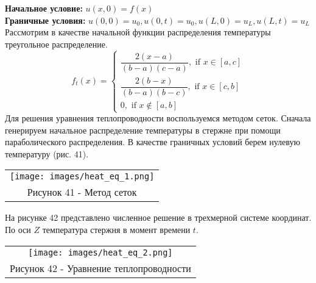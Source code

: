 \textbf{Начальное условие:} $u(x,0)=f(x)$\\
\textbf{Граничные условия:} $u(0,0)=u_0,u(0,t)=u_0,u(L,0)=u_L,u(L,t)=u_L$
Рассмотрим в качестве начальной функции распределения температуры треугольное распределение.
\begin{equation}
  f_t(x)=\begin{cases}
    \dfrac{2(x-a)}{(b-a)(c-a)}, \text{ if } x\in[a,c]\\
    \dfrac{2(b-x)}{(b-a)(b-c)}, \text{ if } x\in[c,b]\\
    0, \text{ if } x\notin[a,b]
  \end{cases}
\end{equation}
Для решения уравнения теплопроводности воспользуемся методом сеток. Сначала генерируем начальное распределение температуры в стержне при помощи параболического распределения. В качестве граничных условий берем нулевую температуру (рис. 41).
\begin{center}
  \begin{tabular}{c}
  \texttt{[image: images/heat\_eq\_1.png]}\\
  Рисунок 41 - Метод сеток
\end{tabular}
\end{center}
На рисунке 42 представлено численное решение в трехмерной системе координат. По оси $Z$ температура стержня в момент времени $t$.
\begin{center}
  \begin{tabular}{c}
  \texttt{[image: images/heat\_eq\_2.png]}\\
  Рисунок 42 - Уравнение теплопроводности
\end{tabular}
\end{center}
